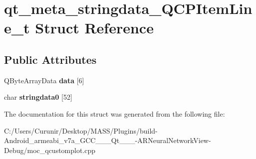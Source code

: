 \hypertarget{structqt__meta__stringdata___q_c_p_item_line__t}{}\section{qt\+\_\+meta\+\_\+stringdata\+\_\+\+Q\+C\+P\+Item\+Line\+\_\+t Struct Reference}
\label{structqt__meta__stringdata___q_c_p_item_line__t}
\subsection*{Public Attributes}
\begin{DoxyCompactItemize}
\item 
\mbox{\label{structqt__meta__stringdata___q_c_p_item_line__t_a1e2e317e2b68cef1ac10a34920a14c44}} 
Q\+Byte\+Array\+Data {\bfseries data} \mbox{[}6\mbox{]}
\item 
\mbox{\label{structqt__meta__stringdata___q_c_p_item_line__t_a1d82b78b85ed5fa606ea7f4baad22d95}} 
char {\bfseries stringdata0} \mbox{[}52\mbox{]}
\end{DoxyCompactItemize}


The documentation for this struct was generated from the following file\+:\begin{DoxyCompactItemize}
\item 
C\+:/\+Users/\+Curunir/\+Desktop/\+M\+A\+S\+S/\+Plugins/build-\/\+Android\+\_\+armeabi\+\_\+v7a\+\_\+\+G\+C\+C\+\_\+\_\+\_\+\+Qt\+\_\+\_\+\_-\/\+A\+R\+Neural\+Network\+View-\/\+Debug/moc\+\_\+qcustomplot.\+cpp\end{DoxyCompactItemize}
